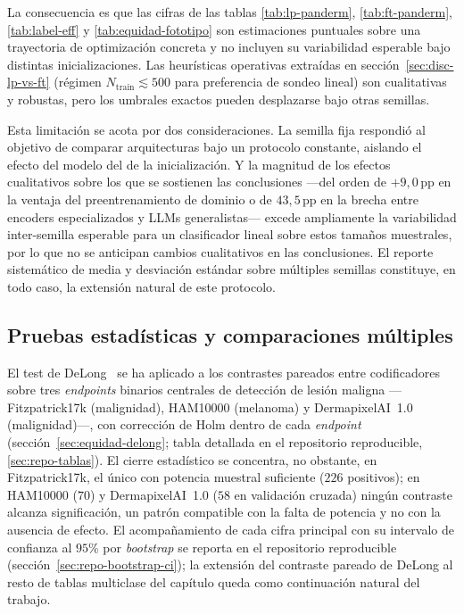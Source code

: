 La consecuencia es que las cifras de las tablas
\ref{tab:lp-panderm}, \ref{tab:ft-panderm}, \ref{tab:label-eff} y
\ref{tab:equidad-fototipo} son estimaciones puntuales sobre una
trayectoria de optimización concreta y no incluyen su variabilidad
esperable bajo distintas inicializaciones. Las heurísticas
operativas extraídas en sección~\ref{sec:disc-lp-vs-ft}
(régimen $N_{\mathrm{train}} \lesssim 500$ para preferencia de
sondeo lineal) son cualitativas y robustas, pero los umbrales
exactos pueden desplazarse bajo otras semillas.

Esta limitación se acota por dos consideraciones. La semilla fija
respondió al objetivo de comparar arquitecturas bajo un protocolo
constante, aislando el efecto del modelo del de la inicialización. Y
la magnitud de los efectos cualitativos sobre los que se sostienen las
conclusiones ---del orden de $+9{,}0$\,pp en la ventaja del
preentrenamiento de dominio o de $43{,}5$\,pp en la brecha entre
encoders especializados y LLMs generalistas--- excede ampliamente la
variabilidad inter-semilla esperable para un clasificador lineal sobre
estos tamaños muestrales, por lo que no se anticipan cambios
cualitativos en las conclusiones. El reporte sistemático de media y
desviación estándar sobre múltiples semillas constituye, en todo caso,
la extensión natural de este protocolo.

\subsection{Pruebas estadísticas y comparaciones múltiples}
\label{sec:lim-estadistica}

El test de DeLong~\cite{delong1988} se ha aplicado a los contrastes
pareados entre codificadores sobre tres \emph{endpoints} binarios
centrales de detección de lesión maligna ---Fitzpatrick17k (malignidad),
HAM10000 (melanoma) y DermapixelAI~1.0 (malignidad)---, con corrección
de Holm dentro de cada \emph{endpoint} (sección~\ref{sec:equidad-delong};
tabla detallada en el repositorio reproducible, \ref{sec:repo-tablas}). El cierre estadístico se concentra, no
obstante, en Fitzpatrick17k, el único con potencia muestral suficiente
($226$ positivos); en HAM10000 ($70$) y DermapixelAI~1.0 ($58$ en
validación cruzada) ningún contraste alcanza significación, un patrón
compatible con la falta de potencia y no con la ausencia de efecto. El
acompañamiento de cada cifra principal con su intervalo de confianza
al $95\%$ por \emph{bootstrap} se reporta en el repositorio
reproducible (sección~\ref{sec:repo-bootstrap-ci}); la extensión del
contraste pareado de DeLong al resto de tablas multiclase del capítulo
queda como continuación natural del trabajo.

